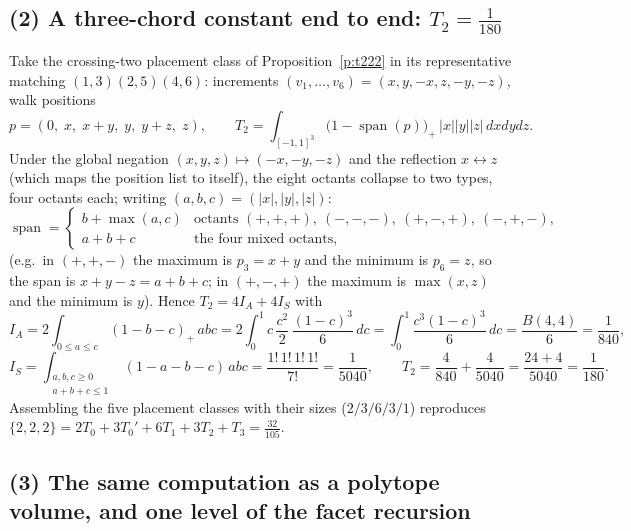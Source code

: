\documentclass[11pt]{article}
\numberwithin{equation}{section}
\theoremstyle{definition}
\theoremstyle{remark}
\begin{document}
\subsection*{(2) A three-chord constant end to end:
$T_2=\tfrac1{180}$}

Take the crossing-two placement class of
Proposition~\ref{p:t222} in its representative matching
$(1,3)(2,5)(4,6)$: increments
$(v_1,\dots,v_6)=(x,y,-x,z,-y,-z)$, walk positions
\[
p=(0,\;x,\;x{+}y,\;y,\;y{+}z,\;z),
\qquad
T_2=\int_{[-1,1]^{3}}
\bigl(1-\operatorname{span}(p)\bigr)_{+}\,|x||y||z|\,dxdydz .
\]
Under the global negation $(x,y,z)\mapsto(-x,-y,-z)$ and the
reflection $x\leftrightarrow z$ (which maps the position list
to itself), the eight octants collapse to two types, four
octants each; writing $(a,b,c)=(|x|,|y|,|z|)$:
\[
\operatorname{span}=
\begin{cases}
b+\max(a,c) & \text{octants } (+,+,+),\ (-,-,-),\
(+,-,+),\ (-,+,-),\\[2pt]
a+b+c & \text{the four mixed octants,}
\end{cases}
\]
(e.g.\ in $(+,+,-)$ the maximum is $p_3=x+y$ and the minimum
is $p_6=z$, so the span is $x+y-z=a+b+c$; in $(+,-,+)$ the
maximum is $\max(x,z)$ and the minimum is $y$). Hence
$T_2=4I_A+4I_S$ with
\[
I_A=2\!\!\int_{0\le a\le c}\!\!(1-b-c)_{+}\,abc
=2\int_0^1\!c\,\frac{c^{2}}2\,\frac{(1-c)^{3}}6\,dc
=\int_0^1\frac{c^{3}(1-c)^{3}}6\,dc
=\frac{B(4,4)}6=\frac1{840},
\]
\[
I_S=\int_{\substack{a,b,c\ge0\\ a+b+c\le1}}(1-a-b-c)\,abc
=\frac{1!\,1!\,1!\,1!}{7!}=\frac1{5040},
\qquad
T_2=\frac4{840}+\frac4{5040}
=\frac{24+4}{5040}=\frac1{180}.
\]
Assembling the five placement classes with their sizes
($2/3/6/3/1$) reproduces
$\{2,2,2\}=2T_0+3T_0'+6T_1+3T_2+T_3=\tfrac{32}{105}$.

\subsection*{(3) The same computation as a polytope volume,
and one level of the facet recursion}
\end{document}
